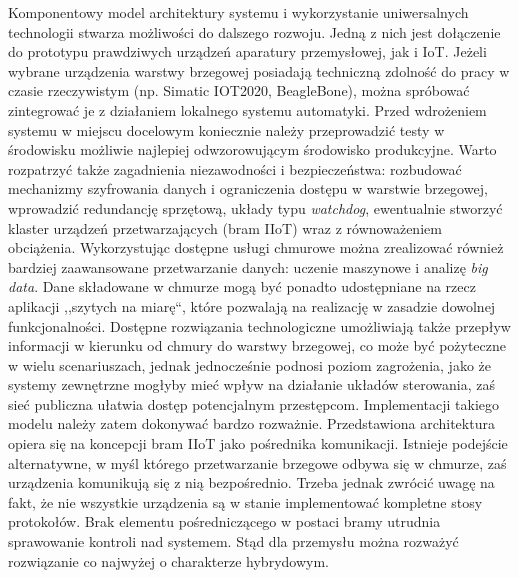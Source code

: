 \documentclass[a4paper, 12pt, twoside]{article}
\begin{document}
Komponentowy model architektury systemu i wykorzystanie uniwersalnych technologii
stwarza możliwości do dalszego rozwoju. Jedną z nich jest dołączenie do prototypu
prawdziwych urządzeń aparatury przemysłowej, jak i IoT. Jeżeli wybrane urządzenia
warstwy brzegowej posiadają techniczną zdolność do pracy w czasie rzeczywistym
(np. Simatic IOT2020, BeagleBone), 
można spróbować zintegrować je z działaniem lokalnego systemu automatyki. Przed wdrożeniem 
systemu w miejscu docelowym koniecznie należy przeprowadzić testy w środowisku
możliwie najlepiej odwzorowującym środowisko produkcyjne. Warto rozpatrzyć także
zagadnienia niezawodności i bezpieczeństwa: rozbudować mechanizmy szyfrowania danych
i ograniczenia dostępu w warstwie brzegowej, wprowadzić redundancję sprzętową,
układy typu \emph{watchdog}, ewentualnie stworzyć klaster urządzeń przetwarzających 
(bram IIoT) wraz z równoważeniem obciążenia. Wykorzystując dostępne usługi 
chmurowe można zrealizować również bardziej zaawansowane przetwarzanie danych:
uczenie maszynowe i analizę \emph{big data}. Dane składowane w chmurze mogą być
ponadto udostępniane na rzecz aplikacji ,,szytych na miarę``, które pozwalają 
na realizację w zasadzie dowolnej funkcjonalności. Dostępne rozwiązania technologiczne 
umożliwiają także przepływ informacji w kierunku od chmury do warstwy brzegowej,
co może być pożyteczne w wielu scenariuszach, jednak jednocześnie podnosi 
poziom zagrożenia, jako że systemy zewnętrzne mogłyby mieć wpływ na działanie 
układów sterowania, zaś sieć publiczna ułatwia dostęp potencjalnym przestępcom. 
Implementacji takiego modelu należy zatem dokonywać bardzo rozważnie. 
Przedstawiona architektura opiera się na koncepcji bram IIoT jako pośrednika 
komunikacji. Istnieje podejście alternatywne, w myśl którego przetwarzanie brzegowe
odbywa się w chmurze, zaś urządzenia komunikują się z nią bezpośrednio. Trzeba 
jednak zwrócić uwagę na fakt, że nie wszystkie urządzenia są w stanie implementować 
kompletne stosy protokołów. Brak elementu pośredniczącego w postaci bramy utrudnia 
sprawowanie kontroli nad systemem. Stąd dla przemysłu można rozważyć 
rozwiązanie co najwyżej o charakterze hybrydowym. 

\newpage
\printbibliography
\end{document}
